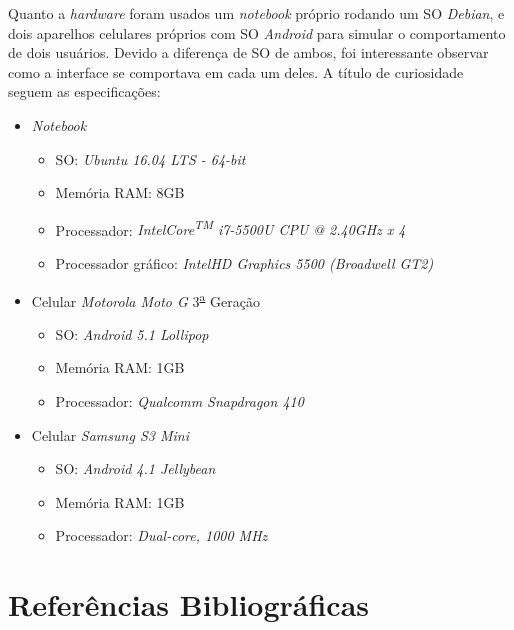 \documentclass[hidelinks,12pt]{article}
\begin{document}
Quanto a \textit{hardware} foram usados um \textit{notebook} pr\'oprio rodando um SO \textit{Debian}, e dois aparelhos celulares pr\'oprios com SO \textit{Android} para simular o comportamento de dois usu\'arios. Devido a diferen\c{c}a de SO de ambos, foi interessante observar como a interface se comportava em cada um deles. A t\'itulo de curiosidade seguem as especifica\c{c}\~oes:
\begin{itemize}
	\item \textit{Notebook}
	\begin{itemize}
		\item SO: \textit{Ubuntu 16.04 LTS - 64-bit}
		\item Mem\'oria RAM: 8GB
		\item Processador: \textit{Intel\textregistered Core\textsuperscript{TM} i7-5500U CPU @ 2.40GHz x 4}
		\item Processador gr\'afico: \textit{Intel\textregistered HD Graphics 5500 (Broadwell GT2)}
	\end{itemize}
	\item Celular \textit{Motorola Moto G} 3\textsuperscript{\underline{a}} Gera\c{c}\~ao
	\begin{itemize}
		\item SO: \textit{Android 5.1 Lollipop}
		\item Mem\'oria RAM: 1GB
		\item Processador: \textit{Qualcomm Snapdragon 410}
	\end{itemize}
	\item Celular \textit{Samsung S3 Mini}
	\begin{itemize}
		\item SO: \textit{Android 4.1 Jellybean}
		\item Mem\'oria RAM: 1GB
		\item Processador: \textit{Dual-core, 1000 MHz}
	\end{itemize}
\end{itemize}
\newpage
\section*{Refer\^encias Bibliogr\'aficas}
\renewcommand\refname{}


\end{document}
